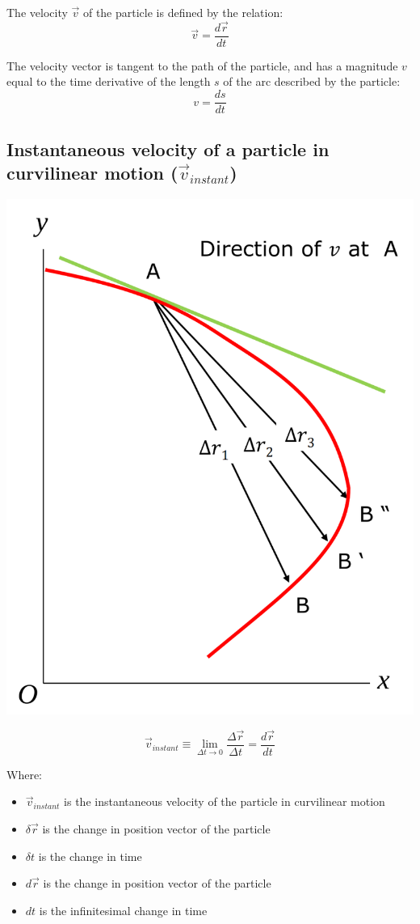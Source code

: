\documentclass[11pt]{article}
\begin{document}
The velocity \(\vec{v}\) of the particle is defined by the relation:
\[\vec{v} = \frac{d \vec{r}}{dt}\]

The velocity vector is tangent to the path of the particle, and has a magnitude \(v\) equal to the time derivative of the length \(s\) of the arc described by the particle:
\[v = \frac{ds}{dt}\]

\subsection{Instantaneous velocity of a particle in curvilinear motion (\(\vec{v}_{instant}\))}
\label{sec:org642e38c}
\begin{center}
\includegraphics[scale=0.6]{./images/instantaneous-velocity-in-curvilinear-motion.png}
\end{center}

\[\vec{v}_{instant} \equiv \lim_{\Delta t \rightarrow 0} \frac{\Delta \vec{r}}{\Delta t} = \frac{d \vec{r}}{dt}\]

Where:
\begin{itemize}
\item \(\vec{v}_{instant}\) is the instantaneous velocity of the particle in curvilinear motion
\item \(\delta \vec{r}\) is the change in position vector of the particle
\item \(\delta t\) is the change in time
\item \(d \vec{r}\) is the change in position vector of the particle
\item \(dt\) is the infinitesimal change in time
\end{itemize}
\end{document}
